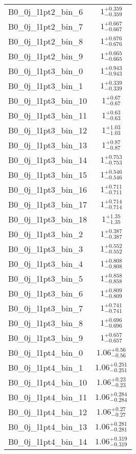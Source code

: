 \begin{tabular}{|l|c|}
B0\_0j\_l1pt2\_bin\_6 & $1^{+0.359}_{-0.359}$ \\
B0\_0j\_l1pt2\_bin\_7 & $1^{+0.667}_{-0.667}$ \\
B0\_0j\_l1pt2\_bin\_8 & $1^{+0.676}_{-0.676}$ \\
B0\_0j\_l1pt2\_bin\_9 & $1^{+0.665}_{-0.665}$ \\
B0\_0j\_l1pt3\_bin\_0 & $1^{+0.943}_{-0.943}$ \\
B0\_0j\_l1pt3\_bin\_1 & $1^{+0.339}_{-0.339}$ \\
B0\_0j\_l1pt3\_bin\_10 & $1^{+0.67}_{-0.67}$ \\
B0\_0j\_l1pt3\_bin\_11 & $1^{+0.63}_{-0.63}$ \\
B0\_0j\_l1pt3\_bin\_12 & $1^{+1.03}_{-1.03}$ \\
B0\_0j\_l1pt3\_bin\_13 & $1^{+0.87}_{-0.87}$ \\
B0\_0j\_l1pt3\_bin\_14 & $1^{+0.753}_{-0.753}$ \\
B0\_0j\_l1pt3\_bin\_15 & $1^{+0.546}_{-0.546}$ \\
B0\_0j\_l1pt3\_bin\_16 & $1^{+0.711}_{-0.711}$ \\
B0\_0j\_l1pt3\_bin\_17 & $1^{+0.714}_{-0.714}$ \\
B0\_0j\_l1pt3\_bin\_18 & $1^{+1.35}_{-1.35}$ \\
B0\_0j\_l1pt3\_bin\_2 & $1^{+0.387}_{-0.387}$ \\
B0\_0j\_l1pt3\_bin\_3 & $1^{+0.552}_{-0.552}$ \\
B0\_0j\_l1pt3\_bin\_4 & $1^{+0.808}_{-0.808}$ \\
B0\_0j\_l1pt3\_bin\_5 & $1^{+0.858}_{-0.858}$ \\
B0\_0j\_l1pt3\_bin\_6 & $1^{+0.809}_{-0.809}$ \\
B0\_0j\_l1pt3\_bin\_7 & $1^{+0.741}_{-0.741}$ \\
B0\_0j\_l1pt3\_bin\_8 & $1^{+0.696}_{-0.696}$ \\
B0\_0j\_l1pt3\_bin\_9 & $1^{+0.657}_{-0.657}$ \\
B0\_0j\_l1pt4\_bin\_0 & $1.06^{+0.56}_{-0.56}$ \\
B0\_0j\_l1pt4\_bin\_1 & $1.06^{+0.251}_{-0.251}$ \\
B0\_0j\_l1pt4\_bin\_10 & $1.06^{+0.23}_{-0.23}$ \\
B0\_0j\_l1pt4\_bin\_11 & $1.06^{+0.284}_{-0.284}$ \\
B0\_0j\_l1pt4\_bin\_12 & $1.06^{+0.27}_{-0.27}$ \\
B0\_0j\_l1pt4\_bin\_13 & $1.06^{+0.281}_{-0.281}$ \\
B0\_0j\_l1pt4\_bin\_14 & $1.06^{+0.319}_{-0.319}$ \\

\end{tabular}

